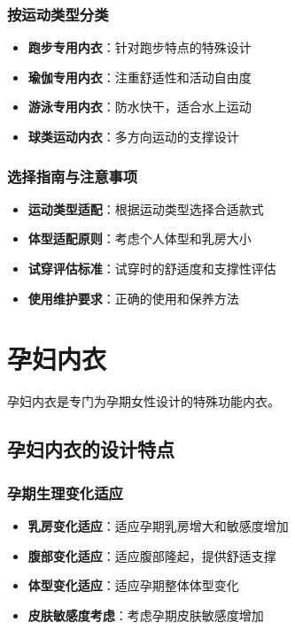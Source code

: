 \documentclass[12pt,UTF8]{ctexbook}
\begin{document}
\subsubsection{按运动类型分类}
\begin{itemize}[leftmargin=2cm]
	\item \textbf{跑步专用内衣}：针对跑步特点的特殊设计
	\item \textbf{瑜伽专用内衣}：注重舒适性和活动自由度
	\item \textbf{游泳专用内衣}：防水快干，适合水上运动
	\item \textbf{球类运动内衣}：多方向运动的支撑设计
\end{itemize}

\subsubsection{选择指南与注意事项}
\begin{itemize}[leftmargin=2cm]
	\item \textbf{运动类型适配}：根据运动类型选择合适款式
	\item \textbf{体型适配原则}：考虑个人体型和乳房大小
	\item \textbf{试穿评估标准}：试穿时的舒适度和支撑性评估
	\item \textbf{使用维护要求}：正确的使用和保养方法
\end{itemize}

\section{孕妇内衣}
孕妇内衣是专门为孕期女性设计的特殊功能内衣。

\subsection{孕妇内衣的设计特点}
\subsubsection{孕期生理变化适应}
\begin{itemize}[leftmargin=2cm]
	\item \textbf{乳房变化适应}：适应孕期乳房增大和敏感度增加
	\item \textbf{腹部变化适应}：适应腹部隆起，提供舒适支撑
	\item \textbf{体型变化适应}：适应孕期整体体型变化
	\item \textbf{皮肤敏感度考虑}：考虑孕期皮肤敏感度增加
\end{itemize}
\end{document}
